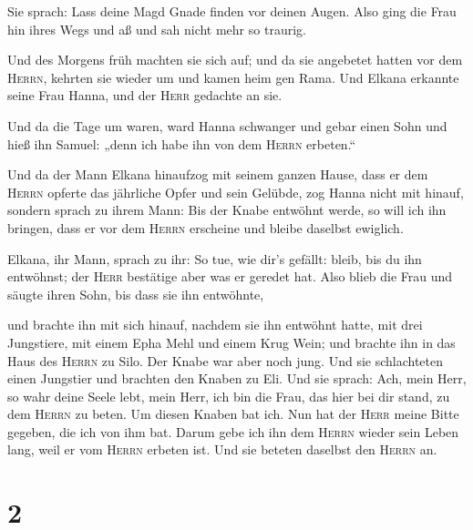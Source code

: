  Sie sprach: Lass deine Magd Gnade finden vor deinen
Augen. Also ging die Frau hin ihres Wegs und aß und sah nicht mehr so
traurig.

 Und des Morgens früh machten sie sich auf; und da sie
angebetet hatten vor dem \textsc{Herrn}, kehrten sie wieder um und kamen
heim gen Rama. Und Elkana erkannte seine Frau Hanna, und der
\textsc{Herr} gedachte an sie.

 Und da die Tage um waren, ward Hanna schwanger und gebar
einen Sohn und hieß ihn Samuel: „denn ich habe ihn von dem
\textsc{Herrn} erbeten.``

 Und da der Mann Elkana hinaufzog mit seinem ganzen
Hause, dass er dem \textsc{Herrn} opferte das jährliche Opfer und sein
Gelübde,  zog Hanna nicht mit hinauf, sondern sprach zu
ihrem Mann: Bis der Knabe entwöhnt werde, so will ich ihn bringen, dass
er vor dem \textsc{Herrn} erscheine und bleibe daselbst ewiglich.

 Elkana, ihr Mann, sprach zu ihr: So tue, wie dir's
gefällt: bleib, bis du ihn entwöhnst; der \textsc{Herr} bestätige aber
was er geredet hat. Also blieb die Frau und säugte ihren Sohn, bis dass
sie ihn entwöhnte,

 und brachte ihn mit sich hinauf, nachdem sie ihn
entwöhnt hatte, mit drei Jungstiere, mit einem Epha Mehl und einem Krug
Wein; und brachte ihn in das Haus des \textsc{Herrn} zu Silo. Der Knabe
war aber noch jung.  Und sie schlachteten einen Jungstier
und brachten den Knaben zu Eli.  Und sie sprach: Ach,
mein Herr, so wahr deine Seele lebt, mein Herr, ich bin die Frau, das
hier bei dir stand, zu dem \textsc{Herrn} zu beten.  Um
diesen Knaben bat ich. Nun hat der \textsc{Herr} meine Bitte gegeben,
die ich von ihm bat.  Darum gebe ich ihn dem
\textsc{Herrn} wieder sein Leben lang, weil er vom \textsc{Herrn}
erbeten ist. Und sie beteten daselbst den \textsc{Herrn} an.

\hypertarget{section-1}{%
\section{2}\label{section-1}}

